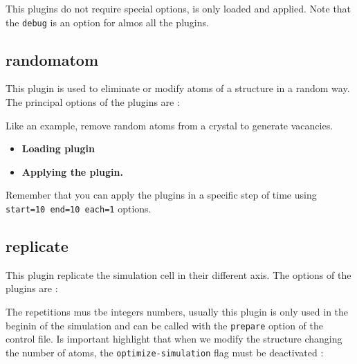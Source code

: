 
This plugins do not require special options, is only loaded and applied. Note
that the \verb|debug| is an option for almos all the plugins.

\subsection{randomatom}
This plugin is used to eliminate or modify atoms of a structure in a random
way. The principal options of the plugins are :


Like an example, remove random atoms from a crystal to generate vacancies.

\begin{itemize}
 \item \textbf{Loading plugin}
 \item \textbf{Applying the plugin.}
\end{itemize}

Remember that you can apply the plugins in a specific step of time using
\texttt{start=10 end=10 each=1} options.

\subsection{replicate}
This plugin replicate the simulation cell in their different axis. The options
of the plugins are :

The repetitions mus tbe integers numbers, usually this plugin is only used in
the beginin of the simulation and can be called with the \verb|prepare| option
of the control file. Is important highlight that when we modify the structure
changing the number of atoms, the \verb|optimize-simulation| flag must be
deactivated :

